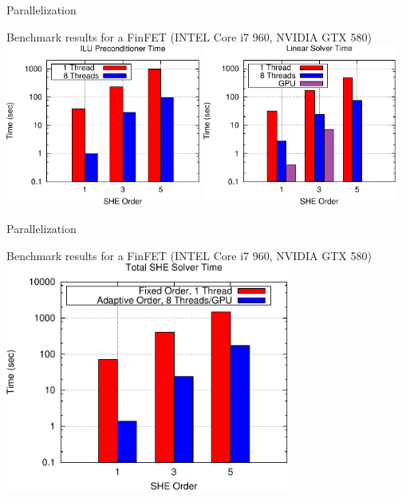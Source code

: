 \documentclass[usepdftitle=false,10pt]{beamer}
\begin{document}
\begin{frame}{Parallelization}
  \vspace{-1.25cm}
  \begin{center}
   Benchmark results for a FinFET (INTEL Core i7 960, NVIDIA GTX 580) \\
   \vspace*{0.5cm}
  \includegraphics[width=0.48\textwidth]{mosfet-precondtimes} \hspace*{0.2cm}
  \includegraphics[width=0.48\textwidth]{mosfet-solvertimes}
  \end{center}
\end{frame}

\begin{frame}{Parallelization}
  \begin{center}
   Benchmark results for a FinFET (INTEL Core i7 960, NVIDIA GTX 580) \\
   \vspace*{0.5cm}
   \includegraphics[width=0.7\textwidth]{mosfet-totaltimes}
  \end{center}
\end{frame}
\end{document}
